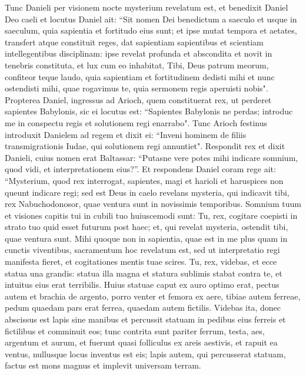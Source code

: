 \begin{biblechapter}
\verse Tunc Danieli per visionem nocte mysterium revelatum est, et benedixit Daniel Deo caeli 
\verse et locutus Daniel ait: “Sit nomen Dei benedictum a saeculo et usque in saeculum, quia sapientia et fortitudo eius sunt; 
\verse et ipse mutat tempora et aetates, transfert atque constituit reges, dat sapientiam sapientibus et scientiam intellegentibus disciplinam: 
\verse ipse revelat profunda et abscondita et novit in tenebris constituta, et lux cum eo inhabitat, 
\verse Tibi, Deus patrum meorum, confiteor teque laudo, quia sapientiam et fortitudinem dedisti mihi et nunc ostendisti mihi, quae rogavimus te, quia sermonem regis aperuisti nobis". 
\verse Propterea Daniel, ingressus ad Arioch, quem constituerat rex, ut perderet sapientes Babylonis, sic ei locutus est: “Sapientes Babylonis ne perdas; introduc me in conspectu regis et solutionem regi enarrabo". 
\verse Tunc Arioch festinus introduxit Danielem ad regem et dixit ei: “Inveni hominem de filiis transmigrationis Iudae, qui solutionem regi annuntiet". 
\verse Respondit rex et dixit Danieli, cuius nomen erat Baltassar: “Putasne vere potes mihi indicare somnium, quod vidi, et interpretationem eius?”. 
\verse Et respondens Daniel coram rege ait: “Mysterium, quod rex interrogat, sapientes, magi et harioli et haruspices non queunt indicare regi; 
\verse sed est Deus in caelo revelans mysteria, qui indicavit tibi, rex Nabuchodonosor, quae ventura sunt in novissimis temporibus. Somnium tuum et visiones capitis tui in cubili tuo huiuscemodi sunt: 
\verse Tu, rex, cogitare coepisti in strato tuo quid esset futurum post haec; et, qui revelat mysteria, ostendit tibi, quae ventura sunt. 
\verse Mihi quoque non in sapientia, quae est in me plus quam in cunctis viventibus, sacramentum hoc revelatum est, sed ut interpretatio regi manifesta fieret, et cogitationes mentis tuae scires. 
\verse Tu, rex, videbas, et ecce statua una grandis: statua illa magna et statura sublimis stabat contra te, et intuitus eius erat terribilis. 
\verse Huius statuae caput ex auro optimo erat, pectus autem et brachia de argento, porro venter et femora ex aere, 
\verse tibiae autem ferreae, pedum quaedam pars erat ferrea, quaedam autem fictilis. 
\verse Videbas ita, donec abscissus est lapis sine manibus et percussit statuam in pedibus eius ferreis et fictilibus et comminuit eos; 
\verse tunc contrita sunt pariter ferrum, testa, aes, argentum et aurum, et fuerunt quasi folliculus ex areis aestivis, et rapuit ea ventus, nullusque locus inventus est eis; lapis autem, qui percusserat statuam, factus est mons magnus et implevit universam terram. 

\end{biblechapter}
